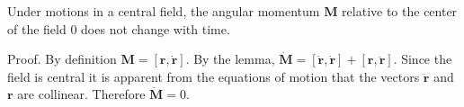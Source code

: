 Under motions in a central field, the angular momentum $\mathbf{M}$ relative to the center of the field $0$ does not change with time.

Proof. By definition $\mathbf{M} = [\mathbf{r}, \dot{\mathbf{r}}]$. By the lemma, $\dot{\mathbf{M}} = [\dot{\mathbf{r}}, \dot{\mathbf{r}}] + [\mathbf{r}, \ddot{\mathbf{r}}]$. Since the field is central it is apparent from the equations of motion that the vectors $\ddot{\mathbf{r}}$ and $\mathbf{r}$ are collinear. Therefore $\dot{\mathbf{M}} = 0$.
